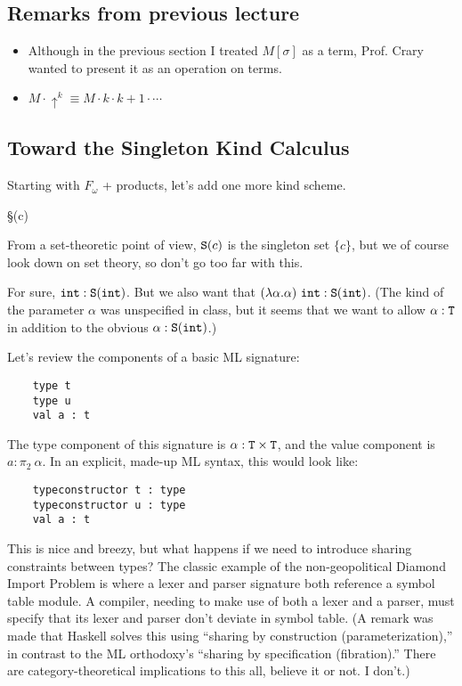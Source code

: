 
\subsection{Remarks from previous lecture}
\begin{itemize}
  \item Although in the previous section I treated $M[\sigma]$ as a term, Prof\@. Crary
    wanted to present it as an operation on terms.
  \item $M \cdot \uparrow^k \equiv M \cdot k \cdot k+1 \cdot \cdots$
\end{itemize}

\subsection{Toward the Singleton Kind Calculus}
Starting with $F_\omega$ + products, let's add one more kind scheme.
\begin{bnf}
  \kappa \bnfeq \T
  \alt \kappa \to \kappa
  \alt \kappa \times \kappa
  \alt \S(c)
\end{bnf}
From a set-theoretic point of view, $\S(c)$ is the singleton set $\{ c \}$, but we of
course look down on set theory, so don't go too far with this.

For sure, $\int : \S(\int)$. But we also want that $(\lambda \alpha. \alpha)~\int : \S(\int)$.
(The kind of the parameter $\alpha$ was unspecified in class, but it seems that we want
to allow $\alpha : \T$ in addition to the obvious $\alpha : \S(\int)$.)

Let's review the components of a basic ML signature:
\begin{verbatim}
    type t
    type u
    val a : t
\end{verbatim}
The type component of this signature is $\alpha : \T \times \T$, and the value component
is $a : \pi_2~\alpha$. In an explicit, made-up ML syntax, this would look like:
\begin{verbatim}
    typeconstructor t : type
    typeconstructor u : type
    val a : t
\end{verbatim}

This is nice and breezy, but what happens if we need to introduce sharing constraints
between types? The classic example of the non-geopolitical Diamond Import Problem is where
a lexer and parser signature both reference a symbol table module.
A compiler, needing to make use of both a lexer and a parser, must specify that its lexer
and parser don't deviate in symbol table.  
(A remark was made that Haskell solves this using ``sharing by construction (parameterization),''
in contrast to the ML orthodoxy's ``sharing by specification (fibration).''
There are category-theoretical implications to this all, believe it or not. I don't.)

